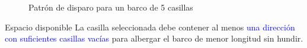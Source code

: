 \begin{frame}
    \begin{figure}
        \begin{columns}[c]
            
            \begin{column}{.5\textwidth}
                \centering
            \end{column}
            \begin{column}{.3\textwidth}
                \centering
                \caption{Patrón de disparo para un barco de 5 casillas}
            \end{column}
        \end{columns}
    \end{figure}
\end{frame}

\begin{frame}
    \begin{block}{Espacio disponible}
        La casilla seleccionada debe contener al menos \textcolor{blue}{una dirección con suficientes casillas vacías} para albergar el barco
        de menor longitud sin hundir.
    \end{block}

\end{frame}

